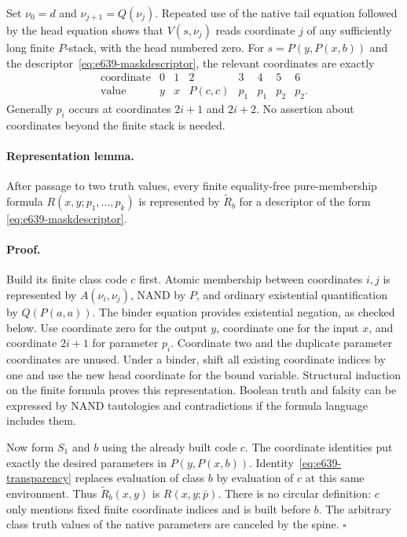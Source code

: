 Set $\nu_0=d$ and $\nu_{j+1}=Q(\nu_j)$.  Repeated use of the
native tail equation followed by the head equation shows that
$V(s,\nu_j)$ reads coordinate $j$ of any sufficiently long finite
$P$-stack, with the head numbered zero.  For
$s=P(y,P(x,b))$ and the descriptor~\eqref{eq:e639-maskdescriptor},
the relevant coordinates are exactly
\[
\begin{array}{c|ccccccc}
\text{coordinate}&0&1&2&3&4&5&6\\ \hline
\text{value}&y&x&P(c,c)&p_1&p_1&p_2&p_2.
\end{array}
\]
Generally $p_i$ occurs at coordinates $2i+1$ and $2i+2$.
No assertion about coordinates beyond the finite stack is needed.

\paragraph{Representation lemma.}
After passage to two truth values, every finite equality-free
pure-membership formula $R(x,y;p_1,\ldots,p_k)$ is represented
by $\widetilde R_b$ for a descriptor of the form
\eqref{eq:e639-maskdescriptor}.

\paragraph{Proof.}
Build its finite class code $c$ first.  Atomic membership between
coordinates $i,j$ is represented by $A(\nu_i,\nu_j)$, NAND
by $P$, and ordinary existential quantification by $Q(P(a,a))$.
The binder equation provides existential negation, as checked below.
Use coordinate zero for the output $y$, coordinate one for the input
$x$, and coordinate $2i+1$ for parameter $p_i$.  Coordinate two
and the duplicate parameter coordinates are unused.  Under a binder,
shift all existing coordinate indices by one and use the new head
coordinate for the bound variable.  Structural induction on the
finite formula proves this representation.  Boolean truth and falsity
can be expressed by NAND tautologies and contradictions if the
formula language includes them.

Now form $S_1$ and $b$ using the already built code $c$.  The
coordinate identities put exactly the desired parameters in
$P(y,P(x,b))$.  Identity~\eqref{eq:e639-transparency} replaces
evaluation of class $b$ by evaluation of $c$ at this same environment.
Thus $\widetilde R_b(x,y)$ is $R(x,y;\bar p)$.
There is no circular definition: $c$ only mentions fixed finite
coordinate indices and is built before $b$.  The arbitrary class
truth values of the native parameters are canceled by the spine.
\hfill$\square$

